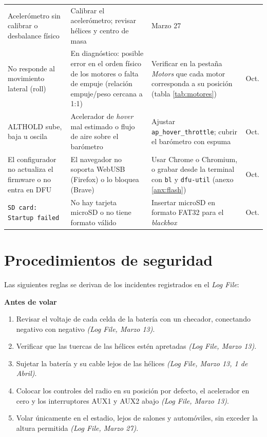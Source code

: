\documentclass[11pt,letterpaper]{article}
\newcommand{\logref}[1]{\textit{(Log File, #1)}}
\begin{document}
\begin{table}[!ht]
\begin{tabularx}{\textwidth}{@{}>{\raggedright\arraybackslash}p{3.2cm}>{\raggedright\arraybackslash}X>{\raggedright\arraybackslash}X>{\raggedright\arraybackslash}p{2.1cm}@{}}
Acelerómetro sin calibrar o desbalance físico &
Calibrar el acelerómetro; revisar hélices y centro de masa &
Marzo 27 \\
\addlinespace
No responde al movimiento lateral (roll) &
En diagnóstico: posible error en el orden físico de los motores o falta de empuje (relación empuje/peso cercana a 1:1) &
Verificar en la pestaña \textit{Motors} que cada motor corresponda a su posición (tabla \ref{tab:motores}) &
23 Oct. \\
\addlinespace
ALTHOLD sube, baja u oscila &
Acelerador de \textit{hover} mal estimado o flujo de aire sobre el barómetro &
Ajustar \texttt{ap\_hover\_throttle}; cubrir el barómetro con espuma &
23 Oct. \\
\addlinespace
El configurador no actualiza el firmware o no entra en DFU &
El navegador no soporta WebUSB (Firefox) o lo bloquea (Brave) &
Usar Chrome o Chromium, o grabar desde la terminal con \texttt{bl} y \texttt{dfu-util} (anexo \ref{anx:flash}) &
23 Oct. \\
\addlinespace
\texttt{SD card: Startup failed} &
No hay tarjeta microSD o no tiene formato válido &
Insertar microSD en formato FAT32 para el \textit{blackbox} &
13 Oct. \\
\bottomrule
\end{tabularx}
\end{table}

\section{Procedimientos de seguridad}
\label{sec:seguridad}
Las siguientes reglas se derivan de los incidentes registrados en el \textit{Log File}:

\noindent\textbf{Antes de volar}
\begin{enumerate}[nosep]
    \item Revisar el voltaje de cada celda de la batería con un checador, conectando negativo con negativo \logref{Marzo 13}.
    \item Verificar que las tuercas de las hélices estén apretadas \logref{Marzo 13}.
    \item Sujetar la batería y su cable lejos de las hélices \logref{Marzo 13, 1 de Abril}.
    \item Colocar los controles del radio en su posición por defecto, el acelerador en cero y los interruptores AUX1 y AUX2 abajo \logref{Marzo 13}.
    \item Volar únicamente en el estadio, lejos de salones y automóviles, sin exceder la altura permitida \logref{Marzo 27}.
\end{enumerate}
\end{document}

